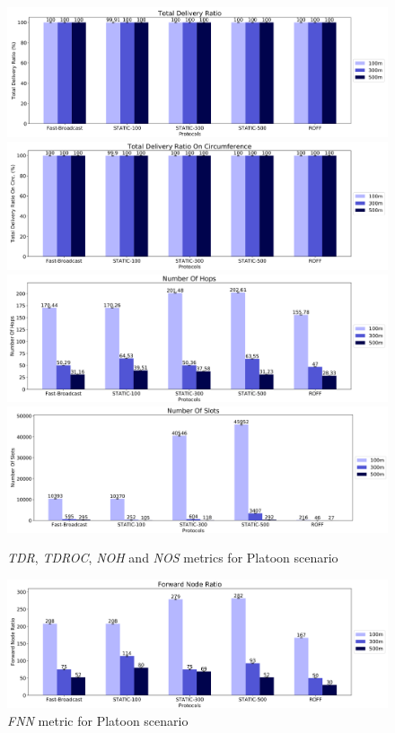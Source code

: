 		\begin{figure}[H]
			\centering
			\includegraphics[width=1.1\textwidth]{immagini/platoon-15km/tdr}
			\includegraphics[width=1.1\textwidth]{immagini/platoon-15km/tdroc}
			\includegraphics[width=1.1\textwidth]{immagini/platoon-15km/noh}
			\includegraphics[width=1.1\textwidth]{immagini/platoon-15km/nos}
			\caption{\textit{TDR}, \textit{TDROC}, \textit{NOH} and \textit{NOS} metrics for Platoon scenario}
			\label{fig:metric-platoon-15km-1}
		\end{figure}

		\begin{figure}[H]
			\centering
			\includegraphics[width=1.1\textwidth]{immagini/platoon-15km/fnn}
			\caption{\textit{FNN} metric for Platoon scenario }
			\label{fig:metric-platoon-15km-2}
		\end{figure}
	
